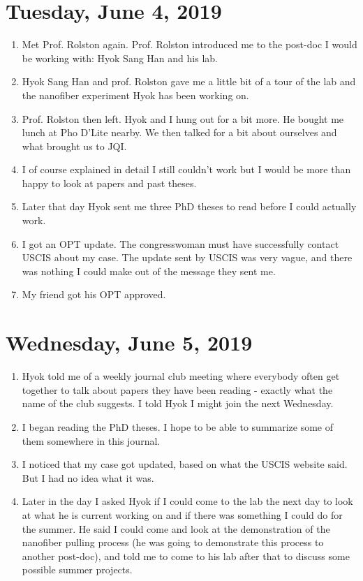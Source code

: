 \documentclass{report}
\theoremstyle{definition}
\begin{document}
\section{Tuesday, June 4, 2019}

\begin{enumerate}
	\item Met Prof. Rolston again. Prof. Rolston introduced me to the post-doc I would be working with: Hyok Sang Han and his lab.
	\item Hyok Sang Han and prof. Rolston gave me a little bit of a tour of the lab and the nanofiber experiment Hyok has been working on. 
	\item Prof. Rolston then left. Hyok and I hung out for a bit more. He bought me lunch at Pho D'Lite nearby. We then talked for a bit about ourselves and what brought us to JQI.
	\item I of course explained in detail I still couldn't work but I would be more than happy to look at papers and past theses.
	\item Later that day Hyok sent me three PhD theses to read before I could actually work. 
	\item I got an OPT update. The congresswoman must have successfully contact USCIS about my case. The update sent by USCIS was very vague, and there was nothing I could make out of the message they sent me. 
	\item My friend got his OPT approved.
\end{enumerate}





\section{Wednesday, June 5, 2019}
\begin{enumerate}
	\item Hyok told me of a weekly journal club meeting where everybody often get together to talk about papers they have been reading - exactly what the name of the club suggests. I told Hyok I might join the next Wednesday.
	\item I began reading the PhD theses. I hope to be able to summarize some of them somewhere in this journal.
	\item I noticed that my case got updated, based on what the USCIS website said. But I had no idea what it was.  
	\item Later in the day I asked Hyok if I could come to the lab the next day to look at what he is current working on and if there was something I could do for the summer. He said I could come and look at the demonstration of the nanofiber pulling process (he was going to demonstrate this process to another post-doc), and told me to come to his lab after that to discuss some possible summer projects. 
\end{enumerate}
\end{document}
